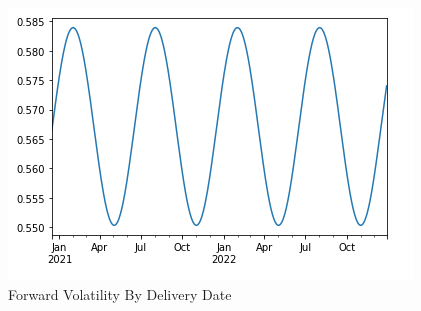 \documentclass{article}
\begin{document}

\begin{figure}
    \includegraphics{vol_seasonality.png}
    \caption{Forward Volatility By Delivery Date}
    \label{fig:seasonal_vol}
\end{figure}




\end{document}
